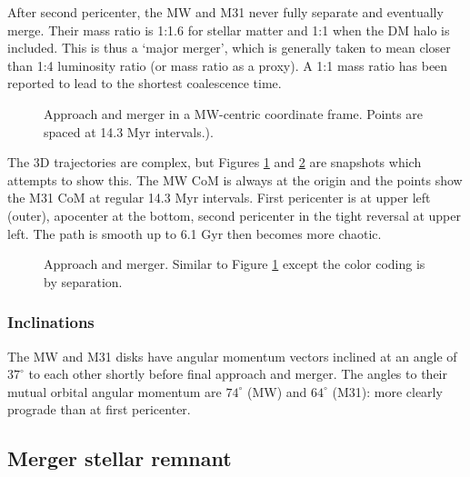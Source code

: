 \documentclass[twocolumn]{aastex63}
\newcommand{\todo}{\color{red}{TODO}\color{black}\hspace{2mm}}
\begin{document}
After second pericenter, the MW and M31 never fully separate and eventually merge. Their mass ratio is 1:1.6 for stellar matter and 1:1 when the DM halo is included. This is thus a `major merger', which is generally taken to mean closer than 1:4 luminosity ratio (or mass ratio as a proxy). A 1:1 mass ratio has been reported \citep{boylan-kolchin_dynamical_2008, ji_lifetime_2014} to lead to the shortest coalescence time.

\begin{figure}[htb!]
	\caption{Approach and merger in a MW-centric coordinate frame. Points are spaced at 14.3 Myr intervals.).
		\label{fig:MW_M31_traj_time}}
\end{figure}

The 3D trajectories are complex, but Figures \ref{fig:MW_M31_traj_time} and \ref{fig:MW_M31_traj_sep} are snapshots which attempts to show this. The MW CoM is always at the origin and the points show the M31 CoM at regular 14.3 Myr intervals. First pericenter is at upper left (outer), apocenter at the bottom, second pericenter in the tight reversal at upper left. The path is smooth up to 6.1 Gyr then becomes more chaotic.

\begin{figure}[htb!]
	\caption{Approach and merger. Similar to Figure \ref{fig:MW_M31_traj_time} except the color coding is by separation.
		\label{fig:MW_M31_traj_sep}}
\end{figure}


\todo{changes in mass profile}

\subsubsection{Inclinations}

The MW and M31 disks have angular momentum vectors inclined at an angle of $37^\circ$ to each other shortly before final approach and merger. The angles to their mutual orbital angular momentum are $74^\circ$ (MW) and $64^\circ$ (M31): more clearly prograde than at first pericenter.

\todo{discuss implications}

\subsection{Merger stellar remnant}
\end{document}
